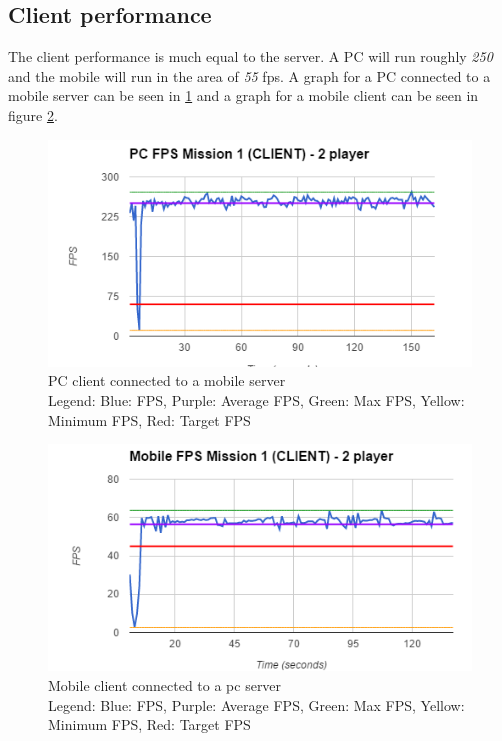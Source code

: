 \subsection*{Client performance}
The client performance is much equal to the server. A PC will run roughly \emph{250} and the mobile will run in the area of \emph{55} fps. A graph for a PC connected to a mobile server can be seen in \ref{test:performance:pcclientmobileserver} and a graph for a mobile client can be seen in figure \ref{test:performance:mobileclientpcserver}.

\begin{figure}
    \includegraphics{figures/test/PCClient2Player}
    \caption{PC client connected to a mobile server \\ Legend: Blue: FPS, Purple: Average FPS, Green: Max FPS, Yellow: Minimum FPS, Red: Target FPS}
    \label{test:performance:pcclientmobileserver}
\end{figure}

\begin{figure}
    \includegraphics{figures/test/MobileClient2Player}
    \caption{Mobile client connected to a pc server \\ Legend: Blue: FPS, Purple: Average FPS, Green: Max FPS, Yellow: Minimum FPS, Red: Target FPS}
    \label{test:performance:mobileclientpcserver}
\end{figure}

